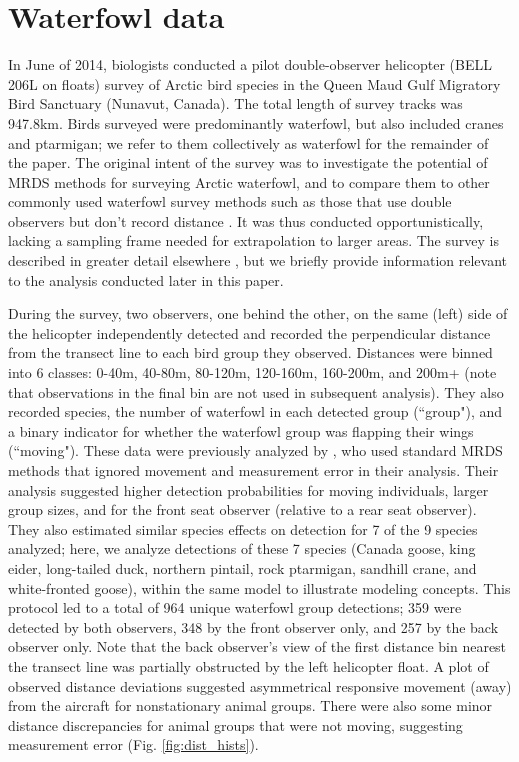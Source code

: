\documentclass[aoas,preprint]{imsart}
\numberwithin{equation}{section}
\theoremstyle{plain}
\begin{document}
\section{Waterfowl data}

In June of 2014, biologists conducted a pilot double-observer helicopter (BELL 206L on floats) survey of Arctic bird species in the Queen Maud Gulf Migratory Bird Sanctuary (Nunavut, Canada). The total length of survey tracks was 947.8km.  Birds surveyed were predominantly waterfowl, but also included cranes and ptarmigan; we refer to them collectively as waterfowl for the remainder of the paper. The original intent of the survey was to investigate the potential of MRDS methods for surveying Arctic waterfowl, and to compare them to other commonly used waterfowl survey methods such as those that use double observers but don't record distance \citep[e.g.][]{KoneffEtAl2008}.  It was thus conducted opportunistically, lacking a sampling frame needed for extrapolation to larger areas.
The survey is described in greater detail elsewhere \citep{AlisauskasConn2017}, but we briefly provide information relevant to the analysis conducted later in this paper.

During the survey, two observers, one behind the other, on the same (left) side of the helicopter independently detected and recorded the perpendicular distance from the transect line to each bird group they observed.  Distances were binned into 6 classes: 0-40m, 40-80m, 80-120m, 120-160m, 160-200m, and 200m+ (note that observations in the final bin are not used in subsequent analysis).  They also recorded species, the number of waterfowl in each detected group (``group"), and a binary indicator for whether the waterfowl group was flapping their wings (``moving").  These data were previously analyzed by \citet{AlisauskasConn2017}, who used standard MRDS methods that ignored movement and measurement error in their analysis.  Their analysis suggested higher detection probabilities for moving individuals, larger group sizes, and for the front seat observer (relative to a rear seat observer).  They also estimated similar species effects on detection for 7 of the 9 species analyzed; here, we analyze detections of these 7 species (Canada goose, king eider, long-tailed duck, northern pintail, rock ptarmigan, sandhill crane, and white-fronted goose), within the same model to illustrate modeling concepts.  This protocol led to a total of 964 unique waterfowl group detections; 359 were detected by both observers, 348 by the front observer only, and 257 by the back observer only.  Note that the back observer's view of the first distance bin nearest the transect line was partially obstructed by the left helicopter float.  A plot of observed distance deviations suggested asymmetrical responsive movement (away) from the aircraft for nonstationary animal groups.  There were also some minor distance discrepancies for animal groups that were not moving, suggesting measurement error (Fig. \ref{fig:dist_hists}).
\end{document}
